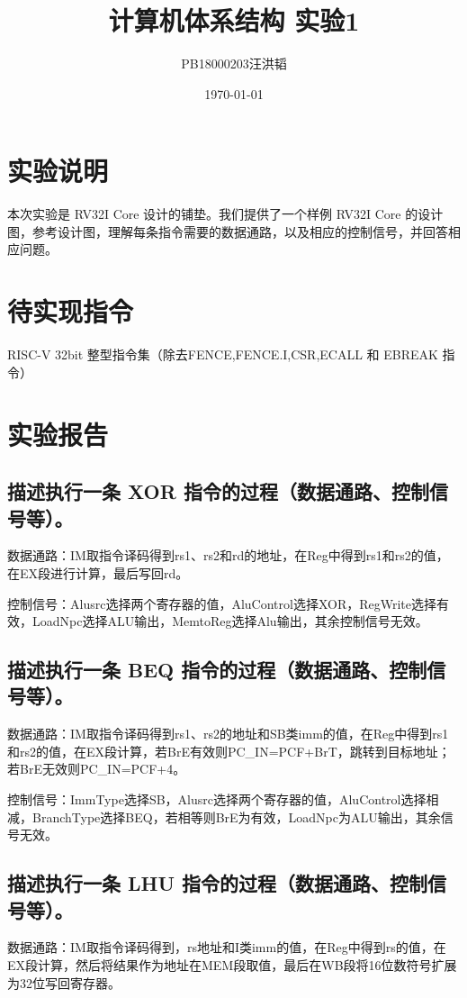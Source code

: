 \documentclass[UTF8]{ctexart}
\title{计算机体系结构 实验1}
\date{\today}
\author{PB18000203汪洪韬}
\begin{document}
	\maketitle
	\section{实验说明}
	本次实验是 RV32I Core 设计的铺垫。我们提供了一个样例 RV32I Core 的设计图，参考设计图，理解每条指令需要的数据通路，以及相应的控制信号，并回答相应问题。
	
	\section{待实现指令}
	RISC-V 32bit 整型指令集（除去FENCE,FENCE.I,CSR,ECALL 和 EBREAK 指令）
	
	\section{实验报告}
	\subsection{描述执行一条 XOR 指令的过程（数据通路、控制信号等）。}
	数据通路：IM取指令译码得到rs1、rs2和rd的地址，在Reg中得到rs1和rs2的值，在EX段进行计算，最后写回rd。
	
	控制信号：Alusrc选择两个寄存器的值，AluControl选择XOR，RegWrite选择有效，LoadNpc选择ALU输出，MemtoReg选择Alu输出，其余控制信号无效。
	
	\subsection{描述执行一条 BEQ 指令的过程（数据通路、控制信号等）。}
	数据通路：IM取指令译码得到rs1、rs2的地址和SB类imm的值，在Reg中得到rs1和rs2的值，在EX段计算，若BrE有效则PC\_IN=PCF+BrT，跳转到目标地址；若BrE无效则PC\_IN=PCF+4。
	
	控制信号：ImmType选择SB，Alusrc选择两个寄存器的值，AluControl选择相减，BranchType选择BEQ，若相等则BrE为有效，LoadNpc为ALU输出，其余信号无效。
	
	\subsection{描述执行一条 LHU 指令的过程（数据通路、控制信号等）。}
	数据通路：IM取指令译码得到，rs地址和I类imm的值，在Reg中得到rs的值，在EX段计算，然后将结果作为地址在MEM段取值，最后在WB段将16位数符号扩展为32位写回寄存器。
	
\end{document}
